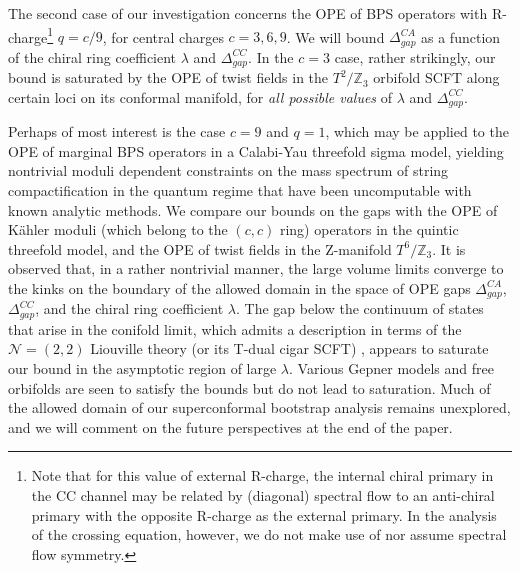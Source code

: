 \documentclass[12pt]{article}
\begin{document}
The second case of our investigation concerns the OPE of BPS operators with R-charge\footnote{Note that for this value of external R-charge, the internal chiral primary in the CC channel may be related by (diagonal) spectral flow to an anti-chiral primary with the opposite R-charge as the external primary. 
In the analysis of the crossing equation, however, we do not make use of nor assume spectral flow symmetry.} $q=c/9$, for central charges $c=3,6,9$. %
We will bound $\Delta_{gap}^{CA}$ as a function of the chiral ring coefficient $\lambda$ and $\Delta_{gap}^{CC}$. In the $c=3$ case, rather strikingly, our bound is saturated by the OPE of twist fields in the $T^2/\mathbb{Z}_3$ orbifold SCFT along certain loci on its conformal manifold, for {\it all possible values} of $\lambda$ and $\Delta^{CC}_{gap}$.

Perhaps of most interest is the case $c=9$ and $q=1$, which may be applied to the OPE of marginal BPS operators in a Calabi-Yau threefold sigma model, yielding nontrivial moduli dependent constraints on the mass spectrum of string compactification in the quantum regime that have been uncomputable with known analytic methods. We compare our bounds on the gaps with the OPE of K\"ahler moduli (which belong to the $(c,c)$ ring) operators in the quintic threefold model, and the OPE of twist fields in the Z-manifold $T^6/\mathbb{Z}_3$. It is observed that, in a rather nontrivial manner, the large volume limits converge to the kinks on the boundary of the allowed domain in the space of OPE gaps $\Delta_{gap}^{CA}$, $\Delta_{gap}^{CC}$, and the chiral ring coefficient $\lambda$. The gap below the continuum of states that arise in the conifold limit, which admits a description in terms of the $\mathcal{N}=(2,2)$ Liouville theory (or its T-dual cigar SCFT) \cite{Ooguri:1995wj, Hori:2001ax}, appears to saturate our bound in the asymptotic region of large $\lambda$. Various Gepner models and free orbifolds are seen to satisfy the bounds but do not lead to saturation. Much of the allowed domain of our superconformal bootstrap analysis remains unexplored, and we will comment on the future perspectives at the end of the paper.
\end{document}
